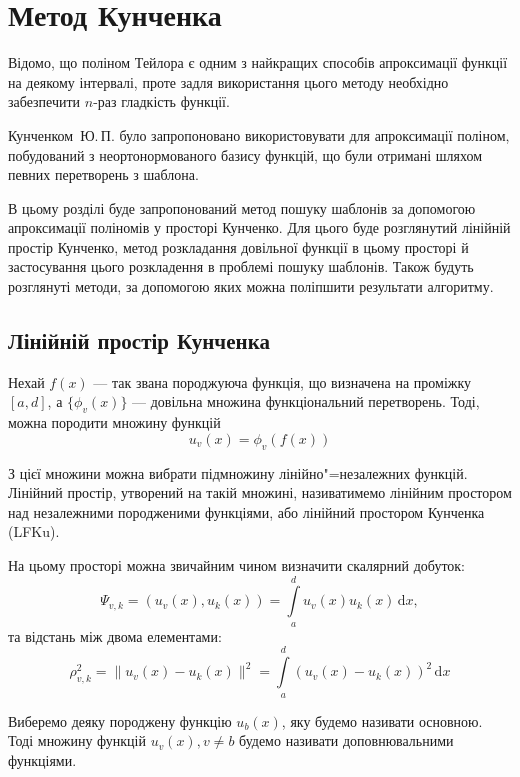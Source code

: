 \chapter{Метод Кунченка}

Відомо, що поліном Тейлора є одним з найкращих способів апроксимації функції на деякому інтервалі, проте задля
використання цього методу необхідно забезпечити $n$-раз гладкість функції.

Кунченком~Ю.\,П. було запропоновано використовувати для апроксимації поліном, побудований з неортонормованого базису
функцій, що були отримані шляхом певних перетворень з шаблона.

В цьому розділі буде запропонований метод пошуку шаблонів за допомогою апроксимації поліномів у просторі Кунченко.
Для цього буде розглянутий лінійній простір Кунченко, метод розкладання довільної функції в цьому просторі й
застосування цього розкладення в проблемі пошуку шаблонів.
Також будуть розглянуті методи, за допомогою яких можна поліпшити результати алгоритму.

\section{Лінійній простір Кунченка}
    Нехай $f(x)$ --- так звана породжуюча функція, що визначена на проміжку ${[a, d]}$, а $\{ \phi_v( x ) \}$ ---
    довільна множина функціональний перетворень.
    Тоді, можна породити множину функцій
    \begin{equation}
        u_v(x) = \phi_v( f( x ))
    \end{equation}

    З цієї множини можна вибрати підмножину лінійно"=незалежних функцій.
    Лінійний простір, утворений на такій множині, називатимемо лінійним простором над незалежними породженими
    функціями, або лінійний простором Кунченка (LFKu).

    На цьому просторі можна звичайним чином визначити скалярний добуток:
    \begin{equation}
        \Psi_{v,k} = (u_v( x ), u_k( x ) ) = \int\limits_a^d u_v( x ) u_k( x )\,\mathrm{d}x,
    \end{equation}
    та відстань між двома елементами:
    \begin{equation}
        \rho_{v,k}^2 = \|u_v( x ) - u_k( x )\|^2 = \int\limits_a^d\left(u_v(x) - u_k(x)\right)^2\,\mathrm{d}x
    \end{equation}

    Виберемо деяку породжену функцію $u_b(x)$, яку будемо називати основною.
    Тоді множину функцій $u_v(x), v \ne b$ будемо називати доповнювальними функціями.

